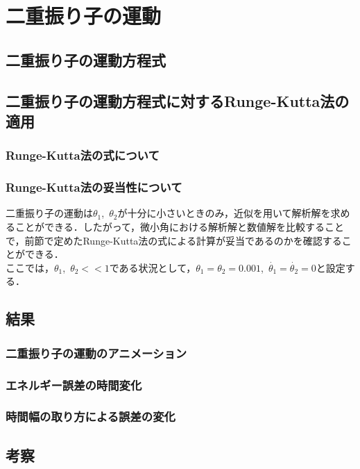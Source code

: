 \documentclass[a4paper,11pt]{jsarticle}
\begin{document}
\newpage
\section{二重振り子の運動}
\subsection{二重振り子の運動方程式}

\subsection{二重振り子の運動方程式に対するRunge-Kutta法の適用}
\subsubsection{Runge-Kutta法の式について}
\subsubsection{Runge-Kutta法の妥当性について}
二重振り子の運動は\(\theta_1\),\ \(\theta_2\)が十分に小さいときのみ，近似を用いて解析解を求めることができる．したがって，微小角における解析解と数値解を比較することで，前節で定めたRunge-Kutta法の式による計算が妥当であるのかを確認することができる．\\
ここでは，\(\theta_1\),\ \(\theta_2 << 1\)である状況として，\(\theta_1 = \theta_2 = 0.001\),\ \(\dot{\theta_1} = \dot{\theta_2} = 0\)と設定する．

\subsection{結果}
\subsubsection{二重振り子の運動のアニメーション}

\subsubsection{エネルギー誤差の時間変化}

\subsubsection{時間幅の取り方による誤差の変化}

\newpage
\subsection{考察}
\end{document}
